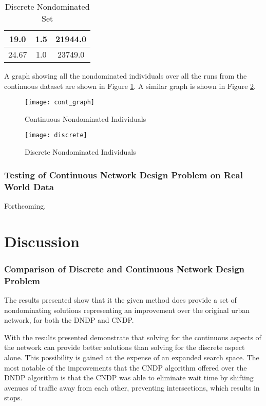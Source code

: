 \documentclass[11pt, oneside, notitlepage, final]{article}
\begin{document}
    \begin{table}[H]
        \label{tab:res1b}
        \centering
        \begin{tabular}{ | c | c | c | }
            \hline
            19.0 & 1.5 & 21944.0 \\ \hline
            24.67 & 1.0 & 23749.0 \\ \hline
        \end{tabular}
        \caption{Discrete Nondominated Set}
    \end{table}

    A graph showing all the nondominated individuals over all the runs from the continuous dataset are shown in Figure \ref{fig:res1b}. A similar graph is shown in Figure \ref{fig:res1a}.

    \begin{figure}[h!]
    \label{fig:res1b}
    \centering
    \texttt{[image: cont\_graph]}
    \caption{Continuous Nondominated Individuals}
    \end{figure}

    \begin{figure}[h!]
    \label{fig:res1a}
    \centering
    \texttt{[image: discrete]}
    \caption{Discrete Nondominated Individuals}
    \end{figure}

    \section{Testing of Continuous Network Design Problem on Real World Data}
        Forthcoming.

\part{Discussion}
    \setcounter{section}{0}
    \section{Comparison of Discrete and Continuous Network Design Problem}
        The results presented show that it the given method does provide a set of nondominating solutions representing an improvement over the original urban network, for both the DNDP and CNDP. 

        With the results presented demonstrate that solving for the continuous aspects of the network can provide better solutions than solving for the discrete aspect alone. This possibility is gained at the expense of an expanded search space. The most notable of the improvements that the CNDP algorithm offered over the DNDP algorithm is that the CNDP was able to eliminate wait time by shifting avenues of traffic away from each other, preventing intersections, which results in stops. 
\end{document}

